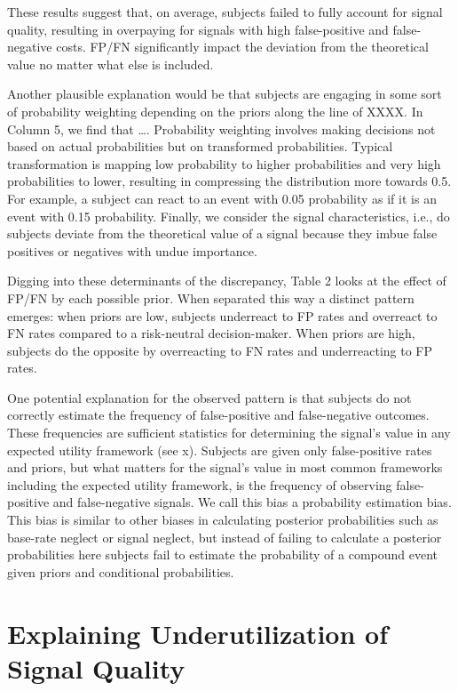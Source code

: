 \documentclass[12pt,a4paper]{article}
\begin{document}
These results suggest that, on average, subjects failed to fully account for signal quality, resulting in overpaying for signals with high false-positive and false-negative costs.  FP/FN significantly impact the deviation from the theoretical value no matter what else is included.  

Another plausible explanation would be that subjects are engaging in some sort of probability weighting depending on the priors along the line of XXXX.  In Column 5, we find that …. Probability weighting involves making decisions not based on actual probabilities but on transformed probabilities. Typical transformation is mapping low probability to higher probabilities and very high probabilities to lower, resulting in compressing the distribution more towards 0.5. For example, a subject can react to an event with 0.05 probability as if it is an event with 0.15 probability.  Finally, we consider the signal characteristics, i.e., do subjects deviate from the theoretical value of a signal because they imbue false positives or negatives with undue importance.

Digging into these determinants of the discrepancy, Table 2 looks at the effect of FP/FN by each possible prior.  When separated this way a distinct pattern emerges: when priors are low, subjects underreact to FP rates and overreact to FN rates compared to a risk-neutral decision-maker. When priors are high, subjects do the opposite by overreacting to FN rates and underreacting to FP rates.

One potential explanation for the observed pattern is that subjects do not correctly estimate the frequency of false-positive and false-negative outcomes. These frequencies are sufficient statistics for determining the signal’s value in any expected utility framework (see x). Subjects are given only false-positive rates and priors, but what matters for the signal’s value in most common frameworks including the expected utility framework, is the frequency of observing false-positive and false-negative signals. We call this bias a probability estimation bias. This bias is similar to other biases in calculating posterior probabilities such as base-rate neglect or signal neglect, but instead of failing to calculate a posterior probabilities here subjects fail to estimate the probability of a compound event given priors and conditional probabilities.

\vspace{20pt}
\section{Explaining Underutilization of Signal Quality}
\end{document}
